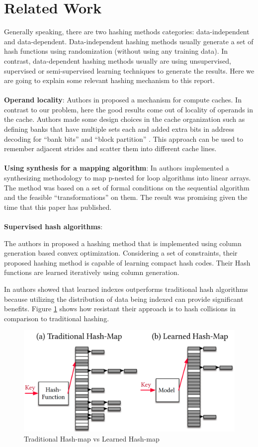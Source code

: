 \section{Related Work}
\label{related_work}
Generally speaking, there are two hashing methods categories: data-independent and data-dependent. Data-independent hashing methods usually generate a set of hash functions using randomization (without using any training data). In contrast,  data-dependent hashing methods usually are using unsupervised, supervised or semi-supervised learning techniques to generate the results. Here we are going to explain some relevant hashing mechanism to this report. 
\\
~
\\
\textbf{Operand locality}: Authors in \cite{compute-caches} proposed a mechanism for compute caches. In contrast to our problem, here the good results come out of locality of operands in the cache. Authors made some design choices in the cache organization such as defining banks that
have multiple sets each and added extra bits in address decoding for ``bank bits'' and ``block partition'' \cite{compute-caches}. This approach can be used to remember adjacent strides and scatter them into different cache lines.
\\
~
\\
\textbf{Using synthesis for a mapping algorithm}: In \cite{synthesis-map} authors implemented a synthesizing methodology to map p-nested for loop algorithms into linear arrays. The method was based on a set of formal conditions on the sequential algorithm and the feasible ``transformations'' on them. The result was promising given the time that this paper has published.
\\
~
\\
\textbf{Supervised hash algorithms}:

The authors in \cite{learning-hash} proposed a hashing method that is implemented using column generation based convex optimization. Considering a set of constraints, their proposed hashing method is capable of learning compact hash codes. Their Hash functions are learned iteratively using column generation.

In \cite{learning-index} authors showed that learned indexes outperforms traditional hash algorithms because utilizing the distribution of data being indexed can provide significant benefits. Figure \ref{fig:learned_index} shows how resistant their approach is to hash collisions in comparison to traditional hashing. 

\begin{figure}[h!]
	\includegraphics[scale=0.2]{figures/learned_index.png}
	\caption{Traditional Hash-map vs Learned Hash-map \cite{learning-index}}
	\label{fig:learned_index}
\end{figure}

\vspace{1mm}
\noindent
